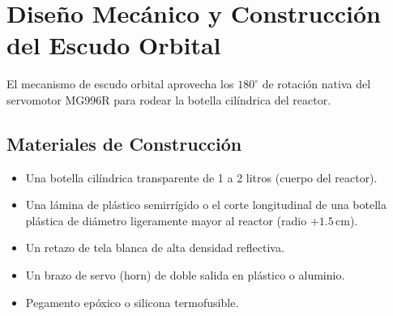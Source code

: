 \documentclass[11pt,letterpaper]{article}
\begin{document}
\section{Diseño Mecánico y Construcción del Escudo Orbital}

El mecanismo de escudo orbital aprovecha los $180^\circ$ de rotación nativa del servomotor MG996R para rodear la botella cilíndrica del reactor.

\subsection{Materiales de Construcción}
\begin{itemize}
    \item Una botella cilíndrica transparente de 1 a 2 litros (cuerpo del reactor).
    \item Una lámina de plástico semirrígido o el corte longitudinal de una botella plástica de diámetro ligeramente mayor al reactor (radio $+1.5\,\text{cm}$).
    \item Un retazo de tela blanca de alta densidad reflectiva.
    \item Un brazo de servo (horn) de doble salida en plástico o aluminio.
    \item Pegamento epóxico o silicona termofusible.
\end{itemize}
\end{document}
